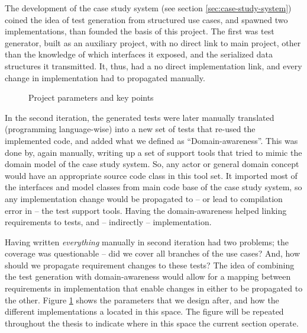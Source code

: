 \noindent The development of the case study system (see section \ref{sec:case-study-system}) coined the idea of test generation from structured use cases, and spawned two implementations, than founded the basis of this project. The first was test generator, built as an auxiliary project, with no direct link to main project, other than the knowledge of which interfaces it exposed, and the serialized data structures it transmitted. It, thus, had a no direct implementation link, and every change in implementation had to propagated manually.\medskip

\begin{figure}[!htbp]
\centering
{}
\caption{Project parameters and key points}
\label{fig:project_parameter_plot}
\end{figure}

\noindent In the second iteration, the generated tests were later manually translated (programming language-wise) into a new set of tests that re-used the implemented code, and added what we defined as ``Domain-awareness''. This was done by, again manually, writing up a set of support tools that tried to mimic the domain model of the case study system. So, any actor or general domain concept would have an appropriate source code class in this tool set. It imported most of the interfaces and model classes from main code base of the case study system, so any implementation change would be propagated to -- or lead to compilation error in -- the test support tools. Having the domain-awareness helped linking requirements to tests, and -- indirectly -- implementation.\medskip

\noindent Having written \emph{everything} manually in second iteration had two problems; the coverage was questionable -- did we cover all branches of the use cases? And, how should we propagate requirement changes to these tests? The idea of combining the test generation with domain-awareness would allow for a mapping between requirements in implementation that enable changes in either to be propagated to the other. Figure \ref{fig:project_parameter_plot} shows the parameters that we design after, and how the different implementations a located in this space. The figure will be repeated throughout the thesis to indicate where in this space the current section operate.\medskip

